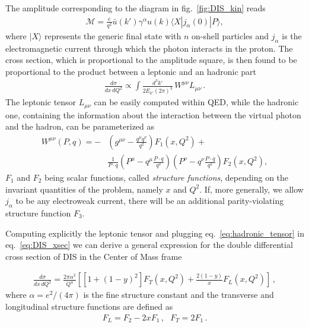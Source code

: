 %
The amplitude corresponding to the diagram in fig.~\ref{fig:DIS_kin} reads
\begin{align}
    \label{eq:DIS_amplitude}
    \mathcal{M} = 
    \frac{e}{q^2}\bar{u}\left(k'\right)\gamma^{\alpha}u\left(k\right)\langle X | j_{\alpha}\left(0\right)|P\rangle,
\end{align}
where $|X\rangle $ represents the generic final state with $n$ on-shell particles and $j_{\alpha}$ 
is the electromagnetic current through which the photon interacts in the proton.
The cross section, which is proportional to the amplitude square, is then found to be proportional to the product between 
a leptonic and an hadronic part
\begin{align}
    \label{eq:DIS_xsec}
    \frac{d\sigma}{dx\,dQ^2} \propto \int \frac{d^3k'}{2E_{k'}\left(2\pi\right)^3}\, W^{\mu\nu}L_{\mu\nu}\,.
\end{align}
The leptonic tensor $L_{\mu\nu}$ can be easily computed within QED, while the hadronic one, containing 
the information about the interaction between the virtual photon and the hadron, can be parameterized as 
\begin{align}
    \label{eq:hadronic_tensor}
    W^{\mu\nu}\left(P,q\right) = 
    -&\left(g^{\mu\nu} -\frac{q^{\mu}q^{\nu}}{q^2}\right)F_1\left(x,Q^2\right) + \nonumber \\
    &\frac{1}{P\cdot q}\left(P^{\mu}-q^{\mu}\frac{P\cdot q}{q^2}\right)\left(P^{\nu}-q^{\nu}\frac{P\cdot q}{q^2}\right)
    F_2\left(x,Q^2\right),
\end{align}
$F_1 $ and $F_2 $ being scalar functions, called \textit{structure functions}, 
depending on the invariant quantities of the problem, namely $x$ and $Q^2$. If, more generally,
we allow $j_{\alpha}$ to be any electroweak current, there will be an additional
parity-violating structure function $F_3$.

%
Computing explicitly the leptonic tensor and plugging eq.~\eqref{eq:hadronic_tensor} in eq.~\eqref{eq:DIS_xsec} 
we can derive a general expression for the double differential cross section of DIS in the Center of Mass frame

\begin{align}
    \label{general cross xsec DIS}
    \frac{d\sigma}{dx\, dQ^2} = \frac{2\pi \alpha^2}{Q^4}\left[\left[1+\left(1-y\right)^2\right]F_T\left(x,Q^2\right) 
    +\frac{2\left(1-y\right)}{x}F_L\left(x,Q^2\right)\right]\,,
\end{align}
where $\alpha = e^2/\left(4\pi\right)$ is the fine structure constant and the transverse and longitudinal structure functions 
are defined as
\begin{align}
    F_L = F_2 -2xF_1\,, \,\,\,\, F_T = 2F_1\,.
\end{align}

